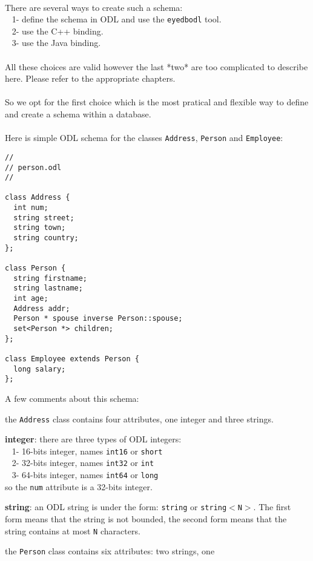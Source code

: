 \\
There are several ways to create such a schema:\\
\mbox{ } 1- define the schema in ODL and use the \texttt{eyedbodl} tool. \\
\mbox{ } 2- use the C++ binding. \\
\mbox{ } 3- use the Java binding. \\
\\
All these choices are valid however the last *two* are too complicated
to describe here. Please refer to the appropriate chapters.
\\
\\
So we opt for the first choice which is the most pratical
and flexible way to define and create a schema within a database.
\\
\\
Here is simple ODL schema for the classes \texttt{Address}, \texttt{Person} 
and \texttt{Employee}:
\verbsize \begin{verbatim}
//
// person.odl
//

class Address {
  int num;
  string street;
  string town;
  string country;
};

class Person {
  string firstname;
  string lastname;
  int age;
  Address addr;
  Person * spouse inverse Person::spouse;
  set<Person *> children;
};

class Employee extends Person {
  long salary;
};
\end{verbatim}
\normalsize
A few comments about this schema:
\bi
\item the \texttt{Address} class contains four attributes, one integer
and three strings.
\bi
\item {\bf integer}: there are three types of ODL integers: \\
\mbox{ } 1- 16-bits integer, names \texttt{int16} or \texttt{short} \\
\mbox{ } 2- 32-bits integer, names \texttt{int32} or \texttt{int} \\
\mbox{ } 3- 64-bits integer, names \texttt{int64} or \texttt{long} \\
so the \texttt{num} attribute is a 32-bits integer.
\item {\bf string}: an ODL string is under the form: \texttt{string} or
\texttt{string$<$N$>$}. The
first form means that the string is not bounded, the second form means
that the string contains at most \texttt{N} characters.
\ei
\item the \texttt{Person} class contains six attributes: two strings, one

